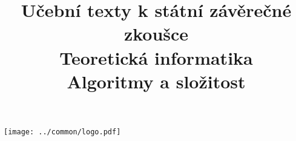 \clearpage

\clearpage

\title{\LARGE Učební texty k státní závěrečné zkoušce \\ Teoretická informatika \\ Algoritmy a složitost}




\maketitle

\vspace{10mm}
\begin{center}
\texttt{[image: ../common/logo.pdf]}
\end{center} 

\clearpage

\clearpage

\tableofcontents







